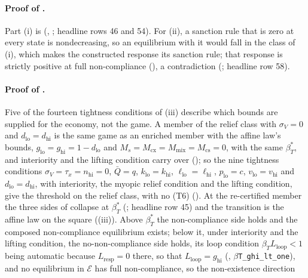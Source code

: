 \paragraph{Proof of .}
Part (i) is  (,
; headline rows 46 and 54). For (ii), a
sanction rule that is zero at every state is nondecreasing, so an equilibrium
with it would fall in the class of (i), which makes the constructed
response its sanction rule; that response is strictly positive at full non-compliance
(), a contradiction (;
headline row 58).

\paragraph{Proof of .}
Five of the fourteen tightness conditions of (iii) describe
which bounds are supplied for the economy, not the game. A member of the relief class with
$\sigma_V=0$ and $d_{\mathrm{lo}}=d_{\mathrm{hi}}$ is the same game as an enriched
member with the affine law's bounds, $g_{\mathrm{lo}}=g_{\mathrm{hi}}=1-d_{\mathrm{lo}}$
and $M_s=M_{\mathrm{cx}}=M_{\mathrm{mix}}=M_{\mathrm{cs}}=0$, with the same
$\beta_T^*$, and interiority and the lifting condition carry over
(); so the nine tightness conditions $\sigma_V=\tau_x=n_{\mathrm{hi}}=0$,
$\bar Q=q$, $k_{\mathrm{lo}}=k_{\mathrm{hi}}$, $\ell_{\mathrm{lo}}=\ell_{\mathrm{hi}}$,
$p_{\mathrm{lo}}=c$, $v_{\mathrm{lo}}=v_{\mathrm{hi}}$ and $d_{\mathrm{lo}}=d_{\mathrm{hi}}$,
with interiority, the myopic relief condition and the lifting condition, give the threshold
on the relief class, with no \textup{(T6)}
(). At the re-certified member the
three sides of  collapse at $\beta_T^*$ (;
headline row 45) and the transition is the affine law on the square
((iii)).
Above $\beta_T^*$ the non-compliance side holds and the composed non-compliance
equilibrium exists; below it, under interiority and the lifting condition, the no-non-compliance
side holds, its loop condition $\beta_TL_{\mathrm{loop}}<1$ being automatic because
$L_{\mathrm{resp}}=0$ there, so that $L_{\mathrm{loop}}=g_{\mathrm{hi}}$
(, \texttt{$\beta$T\_ghi\_lt\_one}), and no equilibrium in
$\mathcal E$ has full non-compliance, so the non-existence direction
